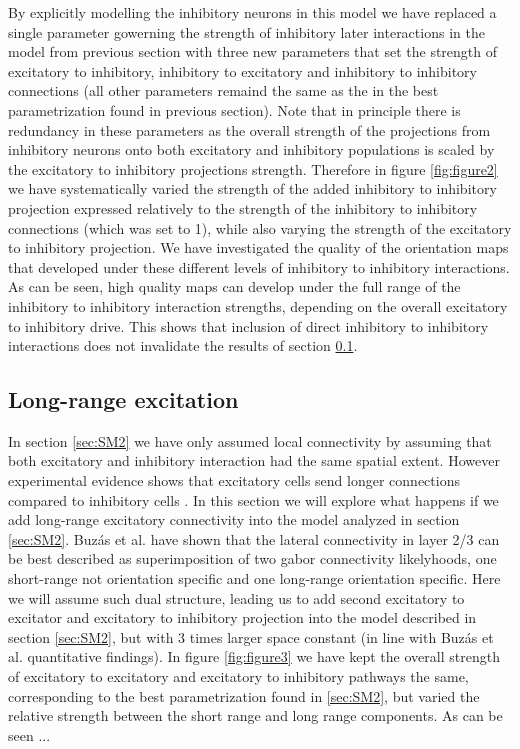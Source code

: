 \documentclass[a4paper,10pt]{article}
\begin{document}
By explicitly modelling the inhibitory neurons in this model we have replaced a single parameter gowerning the strength of inhibitory
later interactions in the model from previous section with three new parameters that set the strength of excitatory to inhibitory,
inhibitory to excitatory and inhibitory to inhibitory connections (all other parameters remaind the same as the 
in the best parametrization found in previous section). Note that in principle there is redundancy in these parameters as
the overall strength of the projections from inhibitory neurons onto both excitatory and inhibitory populations is scaled by the 
excitatory to inhibitory projections strength. Therefore in figure \ref{fig:figure2} we have systematically varied the strength of the added inhibitory to inhibitory
projection expressed relatively to the strength of the inhibitory to inhibitory connections (which was set to 1), while also varying the 
strength of the excitatory to inhibitory projection. We have  investigated the quality of the orientation 
maps that developed under these different levels of inhibitory to inhibitory interactions. As can be seen, high quality maps 
can develop under the full range of the inhibitory to inhibitory interaction strengths, depending on the overall 
excitatory to inhibitory drive. This shows that inclusion of direct inhibitory to inhibitory interactions does not 
invalidate the results of section \ref{sec:SM3}.

\subsection{Long-range excitation} \label{sec:SM3}

In section \ref{sec:SM2} we have only assumed local connectivity by assuming that both excitatory and inhibitory interaction had the same spatial extent. 
However experimental evidence shows that excitatory cells send longer connections compared to inhibitory cells \cite{?}. In this section we will
explore what happens if we add long-range excitatory connectivity into the model analyzed in section \ref{sec:SM2}. Buz\'as et al. \cite{Buzas2006} have
shown that the lateral connectivity in layer 2/3 can be best described as superimposition of two gabor connectivity likelyhoods, one short-range not orientation specific and one long-range orientation specific. Here we will assume such dual structure, leading us to add second excitatory to excitator and excitatory to inhibitory projection into the model described in section \ref{sec:SM2}, but with 3 times larger space constant (in line with Buz\'as et al. quantitative findings). In figure \ref{fig:figure3} we have  kept the overall strength of excitatory to excitatory and excitatory to inhibitory pathways the same, corresponding to the best parametrization found in \ref{sec:SM2}, but varied the relative strength between the short range and long range components. As can be seen ...
\end{document}
